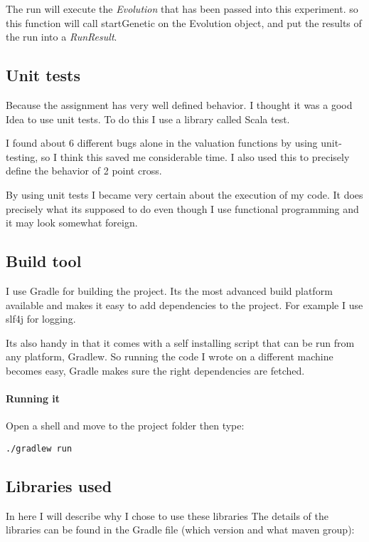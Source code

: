 \documentclass{article}
\begin{document}
\begin{empfile}
The run will execute the \emph{Evolution} that has been passed into this
experiment.  so this function will call startGenetic on the Evolution object, 
and put the results of the run into a \emph{RunResult}.

\subsection{Unit tests}
Because the assignment has very well defined behavior. I thought it was
a good Idea to use unit tests. To do this I use a library called
Scala test.

I found about 6 different bugs alone in the valuation functions by using
unit-testing, so I think this saved me considerable time. I also used this
to precisely define the behavior of 2 point cross.

By using unit tests I became very certain about the execution of my code.
It does precisely what its supposed to do even though I use functional
programming and it may look somewhat foreign.

\subsection{Build tool}
I use Gradle for building the project. Its the most advanced build platform
available and makes it easy to add dependencies to the project.
For example I use slf4j for logging.

Its also handy in that it comes with a self installing script that can be run
from any platform, Gradlew. So running the code I wrote on a different machine
becomes easy, Gradle makes sure the right dependencies are fetched.

\paragraph{Running it}

Open a shell and move to the project folder then type:

\lstset{language=Bash}
\begin{lstlisting}[frame=single]
	./gradlew run
\end{lstlisting}

\subsection{Libraries used}
In here I will describe why I chose to use these libraries
The details of the libraries can be found in the Gradle file (which
version and what maven group):


\end{empfile}
\end{document}
